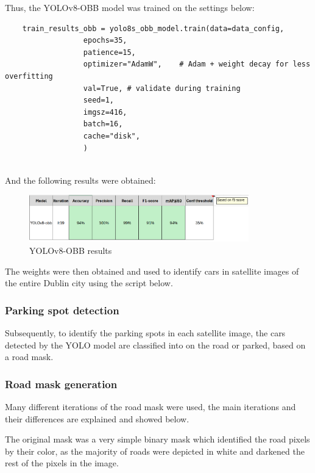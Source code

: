 Thus, the YOLOv8-OBB model was trained on the settings below:
\begin{listing}[h!]
  \centering
  \begin{verbatim}
    train_results_obb = yolo8s_obb_model.train(data=data_config,
                  epochs=35,
                  patience=15,
                  optimizer="AdamW",    # Adam + weight decay for less overfitting
                  val=True, # validate during training
                  seed=1,
                  imgsz=416,
                  batch=16,
                  cache="disk",
                  )
  \end{verbatim}
\end{listing}\\
And the following results were obtained:
\begin{figure}[h!]
  \centering
  \includegraphics[width=0.85\textwidth]{images/yolo-obb-results.png}
  \caption{YOLOv8-OBB results}
\end{figure}

The weights were then obtained and used to identify cars in satellite images of the entire Dublin city using the script below.\\

\subsubsection{Parking spot detection}
Subsequently, to identify the parking spots in each satellite image, the cars detected by the YOLO model are classified into on the road or parked, based on a road mask.

\subsubsection{Road mask generation}
Many different iterations of the road mask were used, the main iterations and their differences are explained and showed below.

The original mask was a very simple binary mask which identified the road pixels by their color, as the majority of roads were depicted in white and darkened the rest of the pixels in the image.

